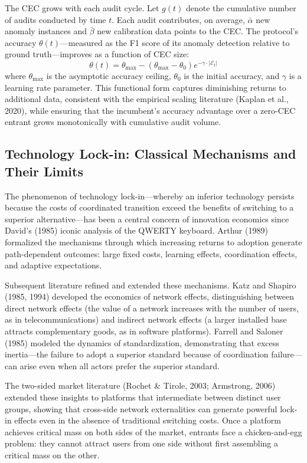 \documentclass[12pt,a4paper]{article}
\theoremstyle{definition}
\theoremstyle{remark}
\begin{document}
The CEC grows with each audit cycle. Let $g(t)$ denote the cumulative number of audits conducted by time $t$. Each audit contributes, on average, $\bar{\alpha}$ new anomaly instances and $\bar{\beta}$ new calibration data points to the CEC. The protocol's accuracy $\theta(t)$—measured as the F1 score of its anomaly detection relative to ground truth—improves as a function of CEC size:
\begin{equation}
\theta(t) = \theta_{\max} - (\theta_{\max} - \theta_0) e^{-\gamma \cdot |\mathcal{E}_t|}
\end{equation}
where $\theta_{\max}$ is the asymptotic accuracy ceiling, $\theta_0$ is the initial accuracy, and $\gamma$ is a learning rate parameter. This functional form captures diminishing returns to additional data, consistent with the empirical scaling literature (Kaplan et al., 2020), while ensuring that the incumbent's accuracy advantage over a zero-CEC entrant grows monotonically with cumulative audit volume.

\subsection{Technology Lock-in: Classical Mechanisms and Their Limits}

The phenomenon of technology lock-in—whereby an inferior technology persists because the costs of coordinated transition exceed the benefits of switching to a superior alternative—has been a central concern of innovation economics since David's (1985) iconic analysis of the QWERTY keyboard. Arthur (1989) formalized the mechanisms through which increasing returns to adoption generate path-dependent outcomes: large fixed costs, learning effects, coordination effects, and adaptive expectations.

Subsequent literature refined and extended these mechanisms. Katz and Shapiro (1985, 1994) developed the economics of network effects, distinguishing between direct network effects (the value of a network increases with the number of users, as in telecommunications) and indirect network effects (a larger installed base attracts complementary goods, as in software platforms). Farrell and Saloner (1985) modeled the dynamics of standardization, demonstrating that excess inertia—the failure to adopt a superior standard because of coordination failure—can arise even when all actors prefer the superior standard.

The two-sided market literature (Rochet \& Tirole, 2003; Armstrong, 2006) extended these insights to platforms that intermediate between distinct user groups, showing that cross-side network externalities can generate powerful lock-in effects even in the absence of traditional switching costs. Once a platform achieves critical mass on both sides of the market, entrants face a chicken-and-egg problem: they cannot attract users from one side without first assembling a critical mass on the other.
\end{document}
